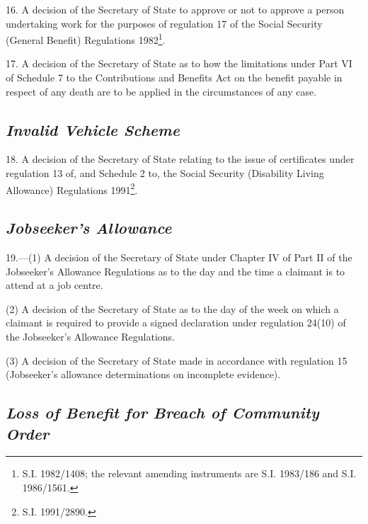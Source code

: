 \documentclass[12pt,a4paper]{article}
\begin{document}
\medskip

16.  A decision of the Secretary of State to approve or not to approve a person undertaking work for the purposes of regulation 17 of the Social Security (General Benefit) Regulations 1982\footnote{\frenchspacing S.I. 1982/1408; the relevant amending instruments are S.I. 1983/186 and S.I. 1986/1561.}.

\medskip

17.  A decision of the Secretary of State as to how the limitations under Part VI of Schedule 7 to the Contributions and Benefits Act on the benefit payable in respect of any death are to be applied in the circumstances of any case.

\subsection*{\itshape Invalid Vehicle Scheme}

18.  A decision of the Secretary of State relating to the issue of certificates under regulation 13 of, and Schedule 2 to, the Social Security (Disability Living Allowance) Regulations 1991\footnote{\frenchspacing S.I. 1991/2890.}.

\subsection*{\itshape Jobseeker’s Allowance}

19.—(1) A decision of the Secretary of State under Chapter IV of Part II of the Jobseeker’s Allowance Regulations as to the day and the time a claimant is to attend at a job centre.

(2) A decision of the Secretary of State as to the day of the week on which a claimant is required to provide a signed declaration under regulation 24(10) of the Jobseeker’s Allowance Regulations.

(3) A decision of the Secretary of State 
made in accordance with regulation 15 (Jobseeker’s allowance determinations on incomplete evidence).


\subsection*{\itshape Loss of Benefit for Breach of Community Order}
\end{document}
